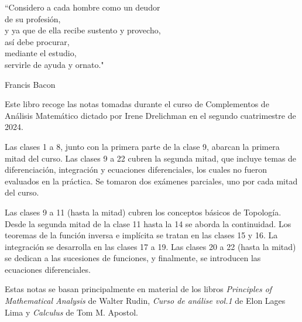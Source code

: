 \epigraph{``Considero a cada hombre como un deudor \\ de su profesión, \\ y ya que de ella recibe sustento y provecho, \\ así debe procurar, \\ mediante el estudio, \\ servirle de ayuda y ornato."}{Francis Bacon}

Este libro recoge las notas tomadas durante el curso de Complementos de Análisis Matemático dictado por Irene Drelichman en el segundo cuatrimestre de 2024.

Las clases 1 a 8, junto con la primera parte de la clase 9, abarcan la primera mitad del curso. Las clases 9 a 22 cubren la segunda mitad, que incluye temas de diferenciación, integración y ecuaciones diferenciales, los cuales no fueron evaluados en la práctica. Se tomaron dos exámenes parciales, uno por cada mitad del curso.

Las clases 9 a 11 (hasta la mitad) cubren los conceptos básicos de Topología. Desde la segunda mitad de la clase 11 hasta la 14 se aborda la continuidad. Los teoremas de la función inversa e implícita se tratan en las clases 15 y 16. La integración se desarrolla en las clases 17 a 19. Las clases 20 a 22 (hasta la mitad) se dedican a las sucesiones de funciones, y finalmente, se introducen las ecuaciones diferenciales.

Estas notas se basan principalmente en material de los libros \textit{Principles of Mathematical Analysis} de Walter Rudin, \textit{Curso de análise vol.1} de Elon Lages Lima y \textit{Calculus} de Tom M. Apostol.
